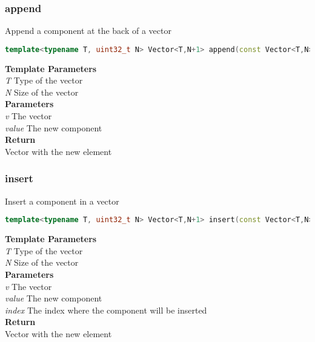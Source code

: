 \subsubsection{append}
\begin{mdframed}
Append a component at the back of a vector
\begin{lstlisting}[language=C++]
template<typename T, uint32_t N> Vector<T,N+1> append(const Vector<T,N>& v, T value) 
\end{lstlisting}
\textbf{Template Parameters} \\ 
\textit{T} Type of the vector \\ 
\textit{N} Size of the vector \\ 
\textbf{Parameters} \\ 
\textit{v} The vector \\ 
\textit{value} The new component \\ 
\textbf{Return} \\ 
Vector with the new element\\ 
\end{mdframed}

\subsubsection{insert}
\begin{mdframed}
Insert a component in a vector
\begin{lstlisting}[language=C++]
template<typename T, uint32_t N> Vector<T,N+1> insert(const Vector<T,N>& v, T value, uint32_t index) 
\end{lstlisting}
\textbf{Template Parameters} \\ 
\textit{T} Type of the vector \\ 
\textit{N} Size of the vector \\ 
\textbf{Parameters} \\ 
\textit{v} The vector \\ 
\textit{value} The new component \\ 
\textit{index} The index where the component will be inserted \\ 
\textbf{Return} \\ 
Vector with the new element\\ 
\end{mdframed}

